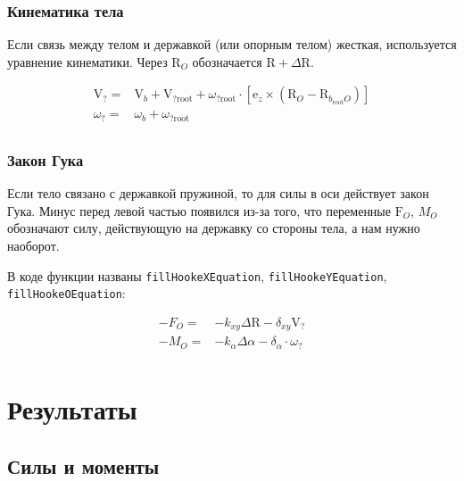 \documentclass[a4paper,14pt]{extreport}
\newcommand{\br}[1]{\boldsymbol{\mathrm{#1}}}
\renewcommand{\vec}[1]{\br{#1}}
\begin{document}
\subsubsection{Кинематика тела}
\label{slau_kinematics}

Если связь между телом и державкой (или опорным телом) жесткая, используется уравнение кинематики. Через $\vec R_O$ обозначается $\vec R+\Delta \vec R$.

\begin{equation}
\begin{split}
\vec V_? =& \vec V_b + \vec V_{?\text{root}} +\omega_{?\text{root}} \cdot
[\vec e_z \times \left( \vec R_O - \vec R_{b_\text{root}O} \right)] \\
\omega_? =& \omega_b + \omega_{?\text{root}} \\
\end{split}
\end{equation}

\subsubsection{Закон Гука}
\label{slau_hooke}

Если тело связано с державкой пружиной, то для силы в оси действует закон Гука.
Минус перед левой частью появился из-за того, что переменные $\vec F_O$, $M_O$ обозначают силу, действующую на державку со стороны тела, а нам нужно наоборот.

В коде функции названы \texttt{fillHookeXEquation}, \texttt{fillHookeYEquation}, \\\texttt{fillHookeOEquation}:

\begin{equation}
\begin{split}
\vec -F_O =& - k_{xy} \Delta \vec R - \delta_{xy} \vec V_?\\
-M_O =& -k_\alpha \Delta \alpha - \delta_\alpha \cdot \omega_? \\
\end{split}
\end{equation}

\section{Результаты}
\subsection{Силы и моменты}
\end{document}
